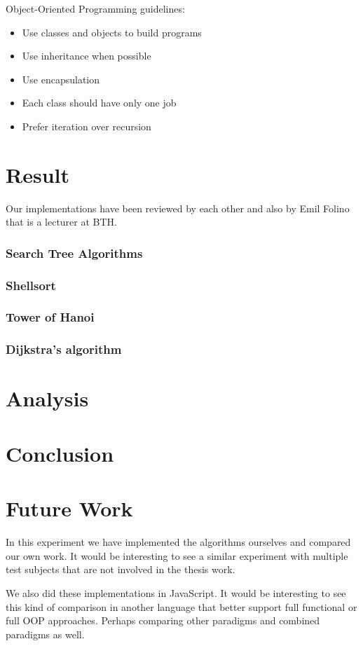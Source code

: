 \documentclass {article}
\begin{document}
Object-Oriented Programming guidelines:
\begin{itemize}
\item Use classes and objects to build programs
\item Use inheritance when possible
\item Use encapsulation
\item Each class should have only one job
\item Prefer iteration over recursion
\end{itemize}

\section{Result}
Our implementations have been reviewed by each other and also by Emil Folino that is a lecturer at BTH. 
\subsubsection{Search Tree Algorithms}
\subsubsection{Shellsort}
\subsubsection{Tower of Hanoi}
\subsubsection{Dijkstra's algorithm}
\section{Analysis}
\section{Conclusion}
\section{Future Work}
In this experiment we have implemented the algorithms ourselves and compared our own work. It would be interesting to see a similar experiment with multiple test subjects that are not involved in the thesis work. 

We also did these implementations in JavaScript. It would be interesting to see this kind of comparison in another language that better support full functional or full OOP approaches. Perhaps comparing other paradigms and combined paradigms as well.
\end{document}
